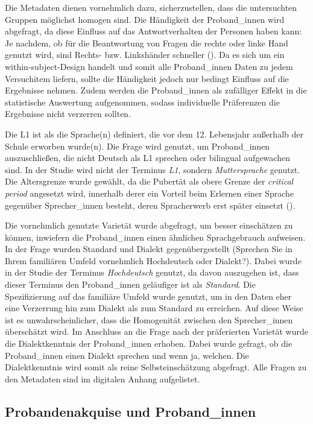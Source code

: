 Die Metadaten dienen vornehmlich dazu, sicherzustellen, dass die untersuchten Gruppen möglichst homogen sind. Die Händigkeit der Proband\_innen wird abgefragt, da diese Einfluss auf das Antwortverhalten der Personen haben kann: Je nachdem, ob für die Beantwortung von Fragen die rechte oder linke Hand genutzt wird, sind Rechts- bzw. Linkshänder schneller (\cite[215]{Hohle.2010}). Da es sich um ein within-subject-Design handelt und somit alle Proband\_innen Daten zu jedem Versuchitem liefern, sollte die Händigkeit jedoch nur bedingt Einfluss auf die Ergebnisse nehmen. Zudem werden die Proband\_innen als zufälliger Effekt in die statistische Auswertung aufgenommen, sodass individuelle Präferenzen die Ergebnisse nicht verzerren sollten.  


Die L1 ist als die Sprache(n) definiert, die vor dem 12. Lebensjahr außerhalb der Schule erworben wurde(n). Die Frage wird genutzt, um Proband\_innen auszuschließen, die nicht Deutsch als L1 sprechen oder bilingual aufgewachen sind. In der Studie wird nicht der Terminus \textit{L1}, sondern \textit{Muttersprache} genutzt. Die Altersgrenze wurde gewählt, da die Pubertät als obere Grenze der \textit{critical period} angesetzt wird, innerhalb derer ein Vorteil beim Erlernen einer Sprache gegenüber Sprecher\_innen besteht, deren Spracherwerb erst später einsetzt (\cite[434]{Fromkin.2014}).


Die vornehmlich genutzte Varietät wurde abgefragt, um besser einschätzen zu können, inwiefern die Proband\_innen einen ähnlichen Sprachgebrauch aufweisen. In der Frage wurden Standard und Dialekt gegenübergestellt (Sprechen Sie in Ihrem familiären Umfeld vornehmlich Hochdeutsch oder Dialekt?). Dabei wurde in der Studie der Terminus \textit{Hochdeutsch} genutzt, da davon auszugehen ist, dass dieser Terminus den Proband\_innen geläufiger ist als \textit{Standard}. Die Spezifizierung auf das familiäre Umfeld wurde genutzt, um in den Daten eher eine Verzerrung hin zum Dialekt als zum Standard zu erreichen. Auf diese Weise ist es unwahrscheinlicher, dass die Homogenität zwischen den Sprecher\_innen überschätzt wird. Im Anschluss an die Frage nach der präferierten Varietät wurde die Dialektkenntnis der Proband\_innen erhoben. Dabei wurde gefragt, ob die Proband\_innen einen Dialekt sprechen und wenn ja, welchen. Die Dialektkenntnis wird somit als reine Selbsteinschätzung abgefragt. Alle Fragen zu den Metadaten sind im digitalen Anhang aufgelistet.

\subsection{Probandenakquise und Proband\_innen}\label{studiefreqprob}\largerpage

